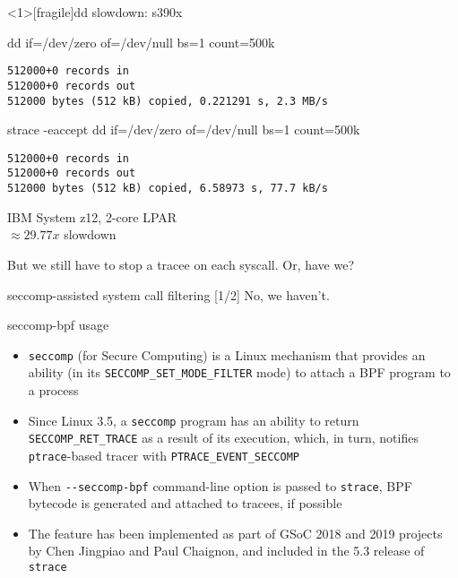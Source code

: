 \documentclass[unicode,aspectratio=169]{beamer}
\begin{document}
\begin{frame}<1>[fragile]{dd slowdown: s390x}
\begin{block}{\large dd if=/dev/zero of=/dev/null bs=1 count=500k}
\begin{verbatim}
512000+0 records in
512000+0 records out
512000 bytes (512 kB) copied, 0.221291 s, 2.3 MB/s
\end{verbatim}
\end{block}
\begin{block}{\large strace -eaccept dd if=/dev/zero of=/dev/null bs=1 count=500k}
\begin{verbatim}
512000+0 records in
512000+0 records out
512000 bytes (512 kB) copied, 6.58973 s, 77.7 kB/s
\end{verbatim}
\end{block}
\begin{scriptsize}
IBM System z12, 2-core LPAR \\
$\approx 29.77x$ slowdown \\
\end{scriptsize}
\pause
But we still have to stop a tracee on each syscall. Or, have we?
\end{frame}



\begin{frame}{seccomp-assisted system call filtering \hfill [1/2]}
No, we haven't.
\pause
\begin{block}{\large seccomp-bpf usage}
\begin{itemize}
  \item \texttt{seccomp} (for Secure Computing) is a Linux mechanism
        that provides an ability (in its \texttt{SECCOMP\_SET\_MODE\_FILTER}
        mode) to attach a BPF program to a process
  \item Since Linux 3.5, a \texttt{seccomp} program has an ability
        to return \texttt{SECCOMP\_RET\_TRACE} as a result of its execution,
        which, in turn, notifies \texttt{ptrace}-based tracer with
        \texttt{PTRACE\_EVENT\_SECCOMP}
  \item When \texttt{-{}-seccomp-bpf} command-line option is passed
        to \texttt{strace}, BPF bytecode is generated and attached to tracees,
        if possible
  \item The feature has been implemented as part of GSoC 2018 and 2019 projects
        by Chen Jingpiao and Paul Chaignon, and included
        in the 5.3 release of \texttt{strace}
\end{itemize}
\end{block}
\end{frame}
\end{document}

